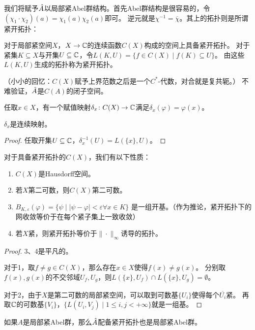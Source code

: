 我们将赋予$\hat{A}$以局部紧Abel群结构。首先Abel群结构是很容易的，令$(\chi_1\cdot \chi_2)(a) = \chi_1(a)\chi_2(a)$即可。
逆元就是$\chi^{-1} = \overline{\chi}$。其上的拓扑则是所谓紧开拓扑：
\begin{definition}
    对于局部紧空间$X$，$X \to \mathbb{C}$的连续函数$C(X)$构成的空间上具备紧开拓扑。
    对于紧集$K \subseteq X$与开集$U \subseteq \mathbb{C}$，令$L(K,U) = \{f\in C(X) \mid f(K) \subseteq U\}$。
    由这些$L(K,U)$生成的拓扑称为紧开拓扑。
\end{definition}

（小小的回忆：$C(X)$赋予上界范数之后是一个$C^*$-代数，对合就是复共轭。）
不难验证，$\hat{A}$是$C(A)$的闭子空间。

任取$x \in X$，有一个赋值映射$\delta_x \colon C(X) \to \mathbb{C}$满足$\delta_x(\varphi) = \varphi(x)$。
\begin{proposition}
    $\delta_x$是连续映射。
\end{proposition}
\begin{proof}
    任取开集$U \subseteq \mathbb{C}$，$\delta_x^{-1}(U) = L(\{x\},U)$。
\end{proof}
对于具备紧开拓扑的$C(X)$，我们有以下性质：
\begin{proposition}
\begin{enumerate}
    \item $C(X)$是Hausdorff空间。
    \item 若$X$第二可数，则$C(X)$第二可数。
    \item $B_{K,\varepsilon}(\varphi) = \{\psi \mid |\psi - \varphi| < \varepsilon \forall x \in K\}$
    是一组开基。（作为推论，紧开拓扑下的网收敛等价于在每个紧子集上一致收敛）
    \item 若$X$紧，则紧开拓扑等价于$\|\cdot\|_\infty$诱导的拓扑。
\end{enumerate}
\end{proposition}
\begin{proof}
    3、4是平凡的。

    对于1，取$f \neq g \in C(X)$，那么存在$x \in X$使得$f(x)\neq g(x)$。
    分别取$f(x),g(x)$的不交邻域$U_f,U_g$，则$L(\{x\},U_f) \cap L(\{x\},U_g) = \emptyset$。

    对于2，由于$X$是第二可数的局部紧空间，可以取到可数基$\{U_i\}$使得每个$\overline{U_i}$紧。
    再取$\mathbb{C}$的可数基$\{V_i\}$，$\{L(U_i,V_j) \mid 1 \leqslant i,j < +\infty\}$就是一组基。
\end{proof}
\begin{theorem}
    如果$A$是局部紧Abel群，那么$\hat{A}$配备紧开拓扑也是局部紧Abel群。
\end{theorem}
